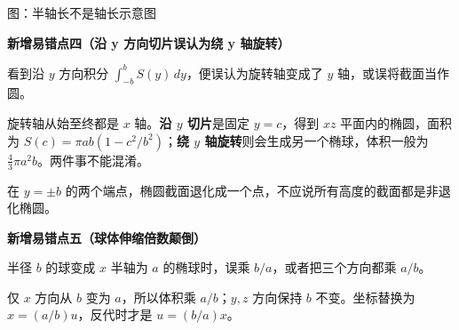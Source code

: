 \begin{trapbox}
\begin{center}
		\vspace{0.4em}
		{\small 图：半轴长不是轴长示意图}
	\end{center}
	\medskip
	\textbf{\textcolor{CTrap}{新增易错点四（沿 y 方向切片误认为绕 y 轴旋转）}}
	\begin{description}[style=nextline, leftmargin=2.8em, labelsep=0.5em, itemsep=0.35em]
		\item[\textbf{错法：}] 看到沿 \(y\) 方向积分 \(\int_{-b}^{b}S(y)\,dy\)，便误认为旋转轴变成了 \(y\) 轴，或误将截面当作圆。
		\item[\textbf{正确：}] 旋转轴从始至终都是 \(x\) 轴。\textbf{沿 \(y\) 切片}是固定 \(y=c\)，得到 \(xz\) 平面内的椭圆，面积为 \(S(c)=\pi ab(1-c^{2}/b^{2})\)；\textbf{绕 \(y\) 轴旋转}则会生成另一个椭球，体积一般为 \(\frac43\pi a^{2}b\)。两件事不能混淆。
		\item[\textbf{边界提醒：}] 在 \(y=\pm b\) 的两个端点，椭圆截面退化成一个点，不应说所有高度的截面都是非退化椭圆。
	\end{description}

	\medskip
	\textbf{\textcolor{CTrap}{新增易错点五（球体伸缩倍数颠倒）}}
	\begin{description}[style=nextline, leftmargin=2.8em, labelsep=0.5em, itemsep=0.35em]
		\item[\textbf{错法：}] 半径 \(b\) 的球变成 \(x\) 半轴为 \(a\) 的椭球时，误乘 \(b/a\)，或者把三个方向都乘 \(a/b\)。
		\item[\textbf{正确：}] 仅 \(x\) 方向从 \(b\) 变为 \(a\)，所以体积乘 \(a/b\)；\(y,z\) 方向保持 \(b\) 不变。坐标替换为 \(x=(a/b)u\)，反代时才是 \(u=(b/a)x\)。
	\end{description}

\end{trapbox}
